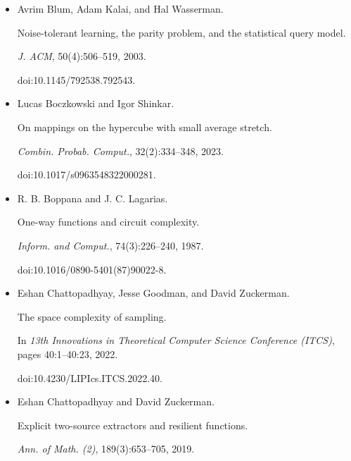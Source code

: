 \documentclass[10pt,a4paper]{article}
\begin{document}
\begin{itemize}
doi:10.1007/s11856-016-1302-0.





\item[] 
[6]

Avrim Blum, Adam Kalai, and Hal Wasserman.


Noise-tolerant learning, the parity problem, and the statistical
query model.


\emph{J. ACM}, 50(4):506–519, 2003.


doi:10.1145/792538.792543.





\item[] 
[7]

Lucas Boczkowski and Igor Shinkar.


On mappings on the hypercube with small average stretch.


\emph{Combin. Probab. Comput.}, 32(2):334–348, 2023.


doi:10.1017/s0963548322000281.





\item[] 
[8]

R. B. Boppana and J. C. Lagarias.


One-way functions and circuit complexity.


\emph{Inform. and Comput.}, 74(3):226–240, 1987.


doi:10.1016/0890-5401(87)90022-8.





\item[] 
[9]

Eshan Chattopadhyay, Jesse Goodman, and David Zuckerman.


The space complexity of sampling.


In \emph{13th Innovations in Theoretical Computer Science Conference
(ITCS)}, pages 40:1–40:23, 2022.


doi:10.4230/LIPIcs.ITCS.2022.40.





\item[] 
[10]

Eshan Chattopadhyay and David Zuckerman.


Explicit two-source extractors and resilient functions.


\emph{Ann. of Math. (2)}, 189(3):653–705, 2019.



\end{itemize}
\end{document}
